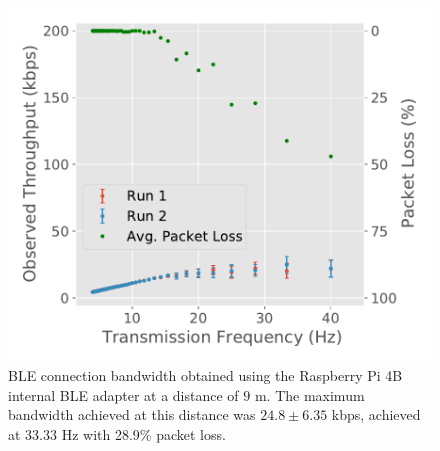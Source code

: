 \begin{figure}[H]
\begin{minipage}{0.45\linewidth}
        \includegraphics[width=\linewidth]{images/ble-bandwidth-hci1-900cm.pdf}
        \caption[\acs{BLE} connection bandwidth obtained using the ASUS USB-BT500 adapter at a distance of 9 m.]{\acs{BLE} connection bandwidth obtained using the Raspberry Pi 4B internal \acs{BLE} adapter at a distance of $9\text{ m}$. The maximum bandwidth achieved at this distance was $24.8 \pm 6.35$ kbps, achieved at 33.33 Hz with 28.9\% packet loss.}
        \label{fig:ble-bandwidth-hci1-9m}
    \end{minipage}
\end{figure}

